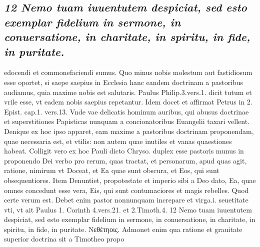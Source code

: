 \documentclass{article}
\begin{document}
\begin{pages}
\subsection*{\textit{12 Nemo tuam iuuentutem despiciat, sed esto exemplar fidelium in sermone, in conuersatione, in charitate, in spiritu, in fide, in puritate.}}edocendi et commonefaciendi sumus. Quo minus nobis molestum aut fastidiosum esse oportet, si saepe saepius in Ecclesia hanc eandem doctrinam a pastoribus audiamus, quia maxime nobis est salutaris. Paulus Philip.3.vers.1. dicit tutum et vrile esse, vt eadem nobis saepius repetantur. Idem docet et affirmat Petrus in 2. Epist. cap.1. vers.13. Vnde vae delicatis hominum auribus, qui abusus doctrinae et superstitiones Papisticas nunquam a concionatoribus Euangelii taxari vellent. Denique ex hoc ipso apparet, eam maxime a pastoribus doctrinam proponendam, quae necessaria est, et vtilis: non autem quae inutiles et vanas quaestiones habeat. Colligit vero ex hoc Pauli dicto Chryso. duplex esse pastoris munus in proponendo Dei verbo pro rerum, quas tractat, et personarum, apud quas agit, ratione, nimirum vt Doceat, et Ea quae sunt obscura, et Eos, qui sunt obsequentiores. Item Denuntiet, propotestate et imperio sibi a Deo dato, Ea, quae omnes concedunt esse vera, Eis, qui sunt contumaciores et magis rebelles. Quod certe verum est. Debet enim pastor nonnunquam increpare et virga.i. seuetitate vti, vt ait Paulus 1. Corinth 4.vers.21. et 2.Timoth.4. 12 Nemo tuam iuuentutem despiciat, sed esto exemplar fidelium in sermone, in conuersatione, in charitate, in spiritu, in fide, in puritate. Νεθέτηοις. Admonet enim qua ratione et grauitate superior doctrina sit a Timotheo propo\pend

\end{pages}
\end{document}
